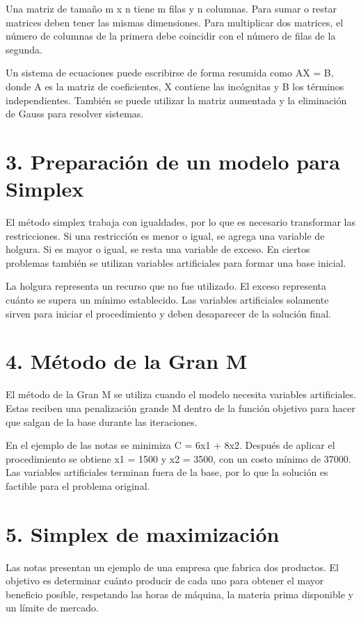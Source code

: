 \documentclass[12pt]{article}
\begin{document}
Una matriz de tamaño m x n tiene m filas y n columnas. Para sumar o restar matrices deben tener las mismas dimensiones. Para multiplicar dos matrices, el número de columnas de la primera debe coincidir con el número de filas de la segunda.

Un sistema de ecuaciones puede escribirse de forma resumida como AX = B, donde A es la matriz de coeficientes, X contiene las incógnitas y B los términos independientes. También se puede utilizar la matriz aumentada y la eliminación de Gauss para resolver sistemas.

\section*{3. Preparación de un modelo para Simplex}
El método simplex trabaja con igualdades, por lo que es necesario transformar las restricciones. Si una restricción es menor o igual, se agrega una variable de holgura. Si es mayor o igual, se resta una variable de exceso. En ciertos problemas también se utilizan variables artificiales para formar una base inicial.

La holgura representa un recurso que no fue utilizado. El exceso representa cuánto se supera un mínimo establecido. Las variables artificiales solamente sirven para iniciar el procedimiento y deben desaparecer de la solución final.

\section*{4. Método de la Gran M}
El método de la Gran M se utiliza cuando el modelo necesita variables artificiales. Estas reciben una penalización grande M dentro de la función objetivo para hacer que salgan de la base durante las iteraciones.

En el ejemplo de las notas se minimiza C = 6x1 + 8x2. Después de aplicar el procedimiento se obtiene x1 = 1500 y x2 = 3500, con un costo mínimo de 37000. Las variables artificiales terminan fuera de la base, por lo que la solución es factible para el problema original.

\section*{5. Simplex de maximización}
Las notas presentan un ejemplo de una empresa que fabrica dos productos. El objetivo es determinar cuánto producir de cada uno para obtener el mayor beneficio posible, respetando las horas de máquina, la materia prima disponible y un límite de mercado.
\end{document}
